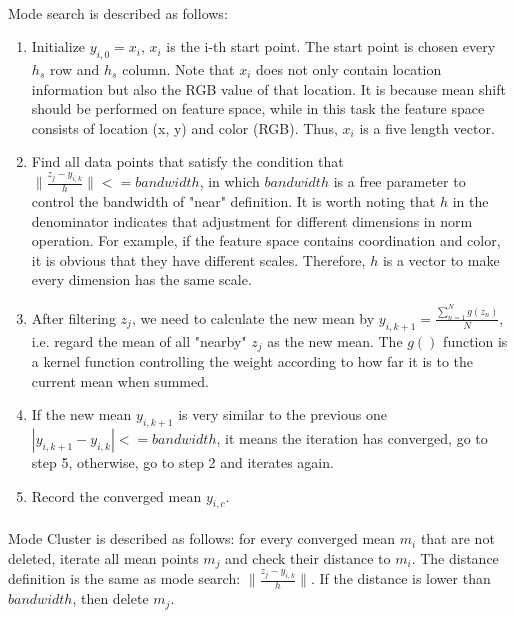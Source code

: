 \documentclass{gapd}
\begin{document}
\paragraph{}
	Mode search is described as follows: 
	\begin{enumerate}
		\item Initialize $y_{i,0} = x_i$, $x_i$ is the i-th start point. The start point is chosen every $h_s$ row and $h_s$ column. Note that $x_i$ does not only contain location information but also the RGB value of that location. It is because mean shift should be performed on feature space, while in this task the feature space consists of location (x, y) and color (RGB). Thus, $x_i$ is a five length vector. 
		\item Find all data points that satisfy the condition that ${\| \frac{z_j - y_{i,k}}{h} \|} <= bandwidth $, in which $bandwidth$ is a free parameter to control the bandwidth of "near" definition. It is worth noting that $h$ in the denominator indicates that adjustment for different dimensions in norm operation. For example, if the feature space contains coordination and color, it is obvious that they have different scales. Therefore, $h$ is a vector to make every dimension has the same scale. 
		\item After filtering $z_j$, we need to calculate the new mean by $y_{i,k+1}=\frac{\sum_{n=1}^N{g(z_n)}}{N}$, i.e. regard the mean of all "nearby" $z_j$ as the new mean. The $g()$ function is a kernel function controlling the weight according to how far it is to the current mean when summed. 
		\item If the new mean $y_{i,k+1}$ is very similar to the previous one $|y_{i,k+1} - y_{i,k}| <= bandwidth$, it means the iteration has converged, go to step 5, otherwise, go to step 2 and iterates again. 
		\item Record the converged mean $y_{i,c}$. 
	\end{enumerate}
\paragraph{}
	Mode Cluster is described as follows: for every converged mean $m_i$ that are not deleted, iterate all mean points $m_j$ and check their distance to $m_i$. The distance definition is the same as mode search: ${\| \frac{z_j - y_{i,k}}{h} \|}$. If the distance is lower than $bandwidth$, then delete $m_j$. 
	
\end{document}
